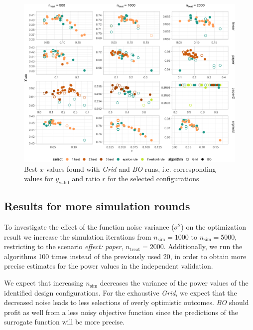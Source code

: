 \documentclass[bimj,fleqn]{w-art}
\theoremstyle{plain}
\theoremstyle{definition}
\begin{document}
\begin{figure}[htb]
\centering
\includegraphics[width=\linewidth]{generated/figures/plot_best_x.pdf}
\caption{Best $x$-values found with \emph{Grid} and \emph{BO} runs, i.e. corresponding values for $y_{\text{valid}}$ and ratio $r$ for the selected configurations}
\label{fig:plot_best_x}
\end{figure}

\subsection{Results for more simulation rounds}

To investigate the effect of the function noise variance ($\sigma^2$) on the optimization result we increase the simulation iterations from $n_\text{sim} = 1000$ to $n_\text{sim} = 5000$, restricting to the scenario \emph{effect: paper}, $n_{\text{treat}} = 2000$.
Additionally, we run the algorithms 100 times instead of the previously used 20, in order to obtain more precise estimates for the power values in the independent validation.

We expect that increasing $n_\text{sim}$ decreases the variance of the power values of the identified design configurations.
For the exhaustive \emph{Grid}, we expect that the decreased noise leads to less selections of overly optimistic outcomes.
\emph{BO} should profit as well from a less noisy objective function since the predictions of the surrogate function will be more precise.
\end{document}
